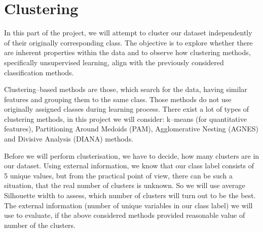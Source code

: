 \documentclass[11pt,a4paper]{article}\usepackage[]{graphicx}\usepackage[]{xcolor}
\begin{document}
	


	


	

	

	

	
	


	

	


	

	

	

	

	

	


	


	

	

	



	




	\section{Clustering}\label{sec:clustering}
	In this part of the project, we will attempt to cluster our dataset independently of their originally corresponding class. The objective is to explore whether there are inherent properties within the data and to observe how clustering methods, specifically unsupervised learning, align with the previously considered classification methods.
		
	Clustering--based methods are those, which search for the data, having similar features and grouping them to the same class. Those methods do not use originally assigned classes during learning process. There exist a lot of types of clustering methods, in this project we will consider: k--means (for quantitative features), Partitioning Around Medoids (PAM), Agglomerative Nesting (AGNES) and Divisive Analysis (DIANA) methods.
	
	Before we will perform clusterisation, we have to decide, how many clusters are in our dataset. Using external information, we know that our class label consists of 5 unique values, but from the practical point of view, there can be such a situation, that the real number of clusters is unknown. So we will use average Silhouette width to assess, which number of clusters will turn out to be the best. The external information (number of unique variables in our class label) we will use to evaluate, if the above considered methods provided reasonable value of number of the clusters.
	
\end{document}
